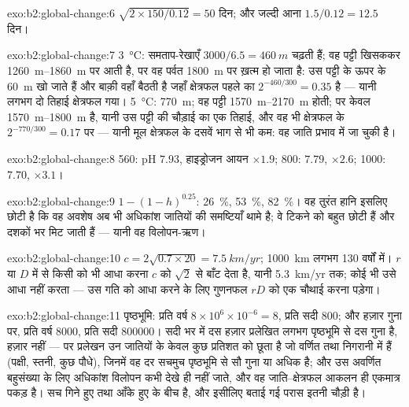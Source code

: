 \begin{solution}{exo:b2:global-change:6}
$\sqrt{2\times 150/0.12} = 50$ दिन; और जल्दी आना $1.5/0.12 = 12.5$
दिन।
\end{solution}

\begin{solution}{exo:b2:global-change:7}
\qty{3}{\celsius}: समताप-रेखाएँ $3000/6.5 = \qty{460}{m}$ चढ़ती हैं; वह
पट्टी खिसककर \qtyrange{1260}{1860}{m} पर आती है, पर वह पर्वत
\qty{1800}{m} पर ख़त्म हो जाता है: उस पट्टी के ऊपर के \qty{60}{m} खो जाते हैं और बाक़ी
वहाँ बैठती है जहाँ क्षेत्रफल पहले का $2^{-460/300} = 0.35$ है --- यानी
लगभग दो तिहाई क्षेत्रफल गया। \qty{5}{\celsius}: \qty{770}{m}; वह
पट्टी \qtyrange{1570}{2170}{m} होती; पर केवल \qtyrange{1570}{1800}{m}
है, यानी उस पट्टी की चौड़ाई का एक तिहाई, और वह भी क्षेत्रफल के
$2^{-770/300} = 0.17$ पर --- यानी मूल क्षेत्रफल के दसवें भाग से भी कम: वह जाति
प्रभाव में जा चुकी है।
\end{solution}

\begin{solution}{exo:b2:global-change:8}
560: pH $7.93$, हाइड्रोजन आयन $\times 1.9$; 800: $7.79$, $\times
2.6$; 1000: $7.70$, $\times 3.1$।
\end{solution}

\begin{solution}{exo:b2:global-change:9}
$1 - (1 - h)^{0.25}$: \qty{26}{\%}, \qty{53}{\%}, \qty{82}{\%}। वह
तुरंत हानि इसलिए छोटी है कि वह अवशेष अब भी अधिकांश जातियों की
समष्टियाँ थामे है; वे टिकने को बहुत छोटी हैं और
दशकों भर मिट जाती हैं --- यानी वह विलोपन-ऋण।
\end{solution}

\begin{solution}{exo:b2:global-change:10}
$c = 2\sqrt{0.7\times 20} = \qty{7.5}{km/yr}$; \qty{1000}{km}
लगभग 130 वर्षों में। $r$ या $D$ में से किसी को भी आधा करना $c$ को
$\sqrt 2$ से बाँट देता है, यानी \qty{5.3}{km/yr} तक; कोई भी उसे आधा नहीं करता --- उस
गति को आधा करने के लिए गुणनफल $rD$ को एक चौथाई करना पड़ेगा।
\end{solution}

\begin{solution}{exo:b2:global-change:11}
पृष्ठभूमि: प्रति वर्ष $8\times 10^{6}\times 10^{-6} = 8$, प्रति सदी 800;
और हज़ार गुना पर, प्रति वर्ष 8000, प्रति सदी \num{800000}।
सदी भर में दस हज़ार प्रलेखित लगभग पृष्ठभूमि से दस गुना है,
हज़ार नहीं --- पर प्रलेखन उन जातियों के केवल
कुछ प्रतिशत को छूता है जो वर्णित तथा निगरानी में हैं (पक्षी,
स्तनी, कुछ पौधे), जिनमें वह दर सचमुच पृष्ठभूमि से सौ
गुना या अधिक है; और उस अवर्णित बहुसंख्या के लिए अधिकांश
विलोपन कभी देखे ही नहीं जाते, और वह जाति--क्षेत्रफल आकलन ही
एकमात्र पकड़ है। सच गिने हुए तथा
आँके हुए के बीच है, और इसीलिए बताई गई परास इतनी चौड़ी है।
\end{solution}

